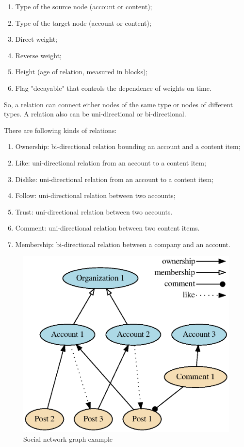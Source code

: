 \documentclass[a4paper,12pt]{article}
\begin{document}
\begin{enumerate}
    \item {Type of the source node (account or content)};
    \item {Type of the target node (account or content)};
    \item {Direct weight};
    \item {Reverse weight};
    \item {Height (age of relation, measured in blocks)};
    \item {Flag "decayable" that controls the dependence of weights on time}.
\end{enumerate}

So, a relation can connect either nodes of the same type or nodes of different types. A relation also can be uni-directional or bi-directional.

There are following kinds of relations:

\begin{enumerate}
    \item { Ownership: bi-directional relation bounding an account and a content item;}
    \item { Like: uni-directional relation from an account to a content item;}
    \item { Dislike: uni-directional relation from an account to a content item;}
    \item { Follow: uni-directional relation between two accounts; }
    \item { Trust: uni-directional relation between two accounts. }
    \item { Comment: uni-directional relation between two content items. }
    \item { Membership: bi-directional relation between a company and an account. }
\end{enumerate}

\begin{figure}[h]
      \includegraphics[width=1\linewidth]{pictures/graph_example.eps}
      \caption{Social network graph example}
      \label{fig:sigmoida}
\end{figure}
\end{document}
